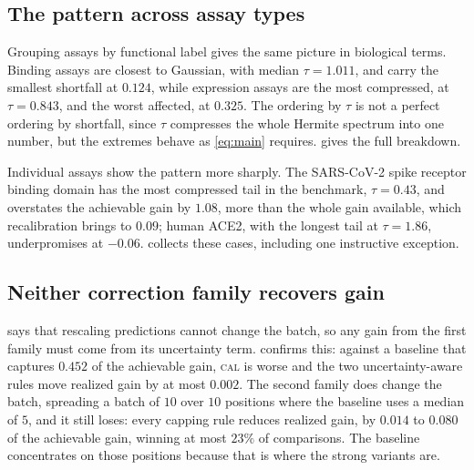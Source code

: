 \documentclass{article}
\theoremstyle{plain}
\theoremstyle{definition}
\begin{document}
\subsection{The pattern across assay types}
\label{sec:results-class}

Grouping assays by functional label gives the same picture in biological terms.
Binding assays are closest to Gaussian, with median $\tau = 1.011$, and carry the
smallest shortfall at $0.124$, while expression assays are the most compressed, at
$\tau = 0.843$, and the worst affected, at $0.325$. The ordering by $\tau$ is not a
perfect ordering by shortfall, since $\tau$ compresses the whole Hermite spectrum into
one number, but the extremes behave as \cref{eq:main} requires.  gives
the full breakdown.

Individual assays show the pattern more sharply. The SARS-CoV-2 spike receptor binding
domain has the most compressed tail in the benchmark, $\tau = 0.43$, and overstates the
achievable gain by $1.08$, more than the whole gain available, which recalibration
brings to $0.09$; human ACE2, with the longest tail at $\tau = 1.86$, underpromises at
$-0.06$.  collects these cases, including one instructive exception.


\subsection{Neither correction family recovers gain}
\label{sec:results-fix}

 says that rescaling predictions cannot change the batch, so any
gain from the first family must come from its uncertainty term. 
confirms this: against a baseline that captures $0.452$ of the achievable gain,
\textsc{cal} is worse and the two uncertainty-aware rules move realized gain by at most
$0.002$. The second family does change the batch, spreading a batch of $10$ over $10$
positions where the baseline uses a median of $5$, and it still loses: every capping
rule reduces realized gain, by $0.014$ to $0.080$ of the achievable gain, winning at
most $23\%$ of comparisons. The baseline concentrates on those positions because that
is where the strong variants are.
\end{document}

